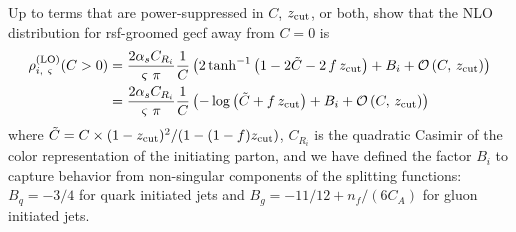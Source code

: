 \begin{exercise}
    \label{ex:rsf-gecf}
    Up to terms that are power-suppressed in \(C\), \(z_{\rm cut}\), or both, show that the NLO distribution for \gls{rsf}-groomed \gls{gecf} away from \(C = 0\) is
    \begin{subequations}
    \label{eq:prsf_LO}
    \begin{align}
        \rho^{\rm(LO)}_{i,~\varsigma}(C>0)
        &=
        \frac{2\alpha_s C_{R_i}}{\varsigma~\pi}
        \frac{1}{C}
        \left(
            2\tanh^{-1}\left(1  -2 \tilde C - 2\,f\,z_{\rm cut}\right)
            + B_i
            +
            \mathcal{O}\left(C,\,z_{\rm cut}\right)
        \right)
        \\
        &=
        \frac{2\alpha_s C_{R_i}}{\varsigma~\pi}
        \frac{1}{C}
        \left(
            -\log\left(\tilde C + f\,z_{\rm cut}\right)
            + B_i
            +
            \mathcal{O}\left(C,\,z_{\rm cut}\right)
        \right)
    \end{align}
    \end{subequations}
    where \(\tilde C = C \times (1-z_{\rm cut})^2 / (1 - (1-f)z_{\rm cut})\), \(C_{R_i}\) is the quadratic Casimir of the color representation of the initiating parton, and we have defined the factor \(B_i\) to capture behavior from non-singular components of the splitting functions:
    \(B_q = -3/4\) for quark initiated jets and \(B_g = -11/12 + n_f/(6 C_A)\) for gluon initiated jets.
\end{exercise}

